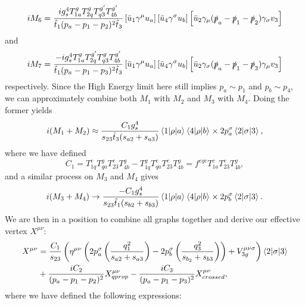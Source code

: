 \begin{equation}
iM_6 = \frac{i g_s^4 T^g_{1a} T^{g}_{2q} T^{g'}_{q3}  T^{g'}_{4b}}{\hat{t}_1 (p_a-p_1-p_2)^2 \hat{t}_3}\left[\bar{u}_1 \gamma^\mu u_a \right] \left[\bar{u}_4 \gamma^\sigma u_b \right] \left[\bar{u}_2 \gamma_\mu(\slashed{p}_a - \slashed{p}_1 -\slashed{p}_2) \gamma_\sigma v_3 \right]
\end{equation}
and
\begin{equation}
iM_7 = \frac{-i g_s^4 T^g_{1a} T^{g'}_{2q} T^{g}_{q3}  T^{g'}_{4b}}{\hat{t}_1 (p_a-p_1-p_3)^2 \hat{t}_3}\left[\bar{u}_1 \gamma^\mu u_a \right] \left[\bar{u}_4 \gamma^\sigma u_b \right] \left[\bar{u}_2 \gamma_\sigma(\slashed{p}_a - \slashed{p}_1 -\slashed{p}_3) \gamma_\mu v_3 \right]
\end{equation}
respectively. Since the High Energy limit here still implies $p_a \sim p_1$ and $p_b \sim p_4$, we can approximately combine both $M_1$ with $M_2$ and $M_3$ with $M_4$. Doing the former yields
\begin{equation}
i(M_1 + M_2) \approx \frac{ C_1 g_s^4}{s_{23} \hat{t}_3 (s_{a2} + s_{a3})} \mathinner{\langle1\vert\rho\vert a\rangle}_{} \mathinner{\langle4\vert\rho\vert b\rangle}_{} \times 2 p_a^\sigma \mathinner{\langle2\vert\sigma\vert3\rangle}_{},
\end{equation} 
where we have defined
\begin{equation}
C_1 = T^e_{1q}T^g_{qa} T^e_{23}T^g_{4b} - T^g_{1q}T^e_{qa}T^e_{23}T^g_{4b} = f^{egc}T^c_{1a}T^e_{23}T^g_{4b},
\end{equation}
and a similar process on $M_3$ and $M_4$ gives
\begin{equation}
i(M_3 + M_4) \to \frac{-C_1 g_s^4}{s_{23}\hat{t}_1 (s_{b2}+s_{b3})} \mathinner{\langle1\vert\rho\vert a\rangle}_{} \mathinner{\langle4\vert\rho\vert b\rangle}_{} \times 2 p_b^\sigma \mathinner{\langle2\vert\sigma\vert3\rangle}_{}. 
\end{equation}
We are then in a position to combine all graphs together and derive our effective vertex $X^{\mu \nu}$:
\begin{equation}
\begin{split}
X^{\mu \nu} &=  \frac{C_1}{s_{23}}\left(\eta^{\mu \nu}\left(2 p_a^\sigma \left( \frac{q_1^2}{s_{a2}+s_{a3}} \right) - 2 p_b^\sigma \left(\frac{q_3^2}{s_{b_2}+s_{b3}} \right) \right)+ V_{3g}^{\mu \nu \sigma} \right)\mathinner{\langle2\vert\sigma\vert3\rangle}_{} \\
&+ \frac{i C_2}{(p_a-p_1-p_2)^2} X_{qprop}^{\mu \nu} - \frac{i C_3}{(p_a-p_1-p_3)^2} X_{crossed}^{\mu \nu},
\end{split}
\end{equation}
where we have defined the following expressions: %
